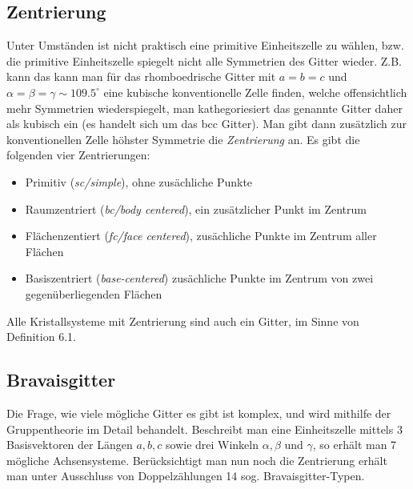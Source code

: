 \documentclass[bfvec]{summery_5.0}
\begin{document}
\subsection{Zentrierung}
Unter Umständen ist nicht praktisch eine primitive Einheitszelle zu wählen, bzw. die primitive Einheitszelle spiegelt nicht alle Symmetrien des Gitter wieder. Z.B. kann das kann man für das rhomboedrische Gitter mit $a=b=c$ und $\alpha=\beta=\gamma\sim109.5^\circ$ eine kubische konventionelle Zelle finden, welche offensichtlich mehr Symmetrien wiederspiegelt, man kathegoriesiert das genannte Gitter daher als kubisch ein (es handelt sich um das bcc Gitter). Man gibt dann zusätzlich zur konventionellen Zelle höhster Symmetrie die \emph{Zentrierung} an. Es gibt die folgenden vier Zentrierungen:
\begin{itemize}
    \item Primitiv (\emph{sc/simple}), ohne zusächliche Punkte
    \item Raumzentriert (\emph{bc/body centered}), ein zusätzlicher Punkt im Zentrum 
    \item Flächenzentiert (\emph{fc/face centered}), zusächliche Punkte im Zentrum aller Flächen
    \item Basiszentriert (\emph{base-centered}) zusächliche Punkte im Zentrum von zwei gegenüberliegenden Flächen 
\end{itemize}
Alle Kristallsysteme mit Zentrierung sind auch ein Gitter, im Sinne von Definition 6.1.

\subsection{Bravaisgitter}
Die Frage, wie viele mögliche Gitter es gibt ist komplex, und wird mithilfe der Gruppentheorie im Detail behandelt. Beschreibt man eine Einheitszelle mittels 3 Basisvektoren der Längen $a,b,c$ sowie drei Winkeln $\alpha,\beta$ und $\gamma$, so erhält man 7 mögliche Achsensysteme. Berücksichtigt man nun noch die Zentrierung erhält man unter Ausschluss von Doppelzählungen 14 sog. Bravaisgitter-Typen.
\end{document}
